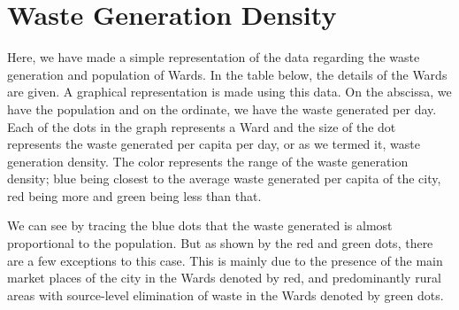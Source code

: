 \documentclass[12pt,a4paper]{report}
\begin{document}
\section{Waste Generation Density}
\begin{justify}
	Here, we have made a simple representation of the data regarding the waste generation and population of Wards. In the table below, the details of the Wards are given. A graphical representation is made using this data. On the abscissa, we have the population and on the ordinate, we have the waste generated per day. Each of the dots in the graph represents a Ward and the size of the dot represents the waste generated per capita per day, or as we termed it, waste generation density. The color represents the range of the waste generation density; blue being closest to the average waste generated per capita of the city, red being more and green being less than that.
	
	
	
	We can see by tracing the blue dots that the waste generated is almost proportional to the population. But as shown by the red and green dots, there are a few exceptions to this case. This is mainly due to the presence of the main market places of the city in the Wards denoted by red, and predominantly rural areas with source-level elimination of waste in the Wards denoted by green dots.
	\vspace{1cm}
	

\end{justify}
\end{document}
